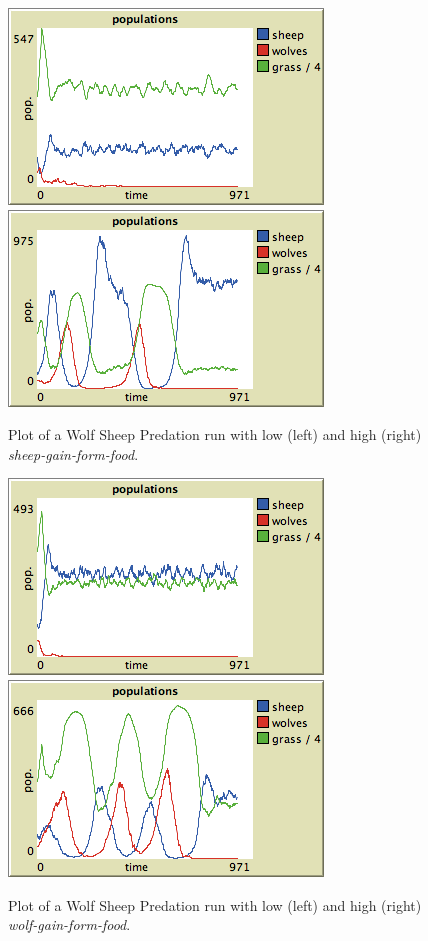 \begin{figure}[ht]
\centering
\includegraphics[scale=.666667]{images/wolfsheep/sheepfood_low.png}
\includegraphics[scale=.666667]{images/wolfsheep/sheepfood_high.png}
\caption{Plot of a Wolf Sheep Predation run with low (left) and high (right) \textit{sheep-gain-form-food}.}
\label{fig:wsp_sheepfood}
\end{figure}


\begin{figure}[ht]
\centering
\includegraphics[scale=.666667]{images/wolfsheep/wolffood_low.png}
\includegraphics[scale=.666667]{images/wolfsheep/wolffood_high.png}
\caption{Plot of a Wolf Sheep Predation run with low (left) and high (right) \textit{wolf-gain-form-food}.}
\label{fig:wsp_wolffood}
\end{figure}


